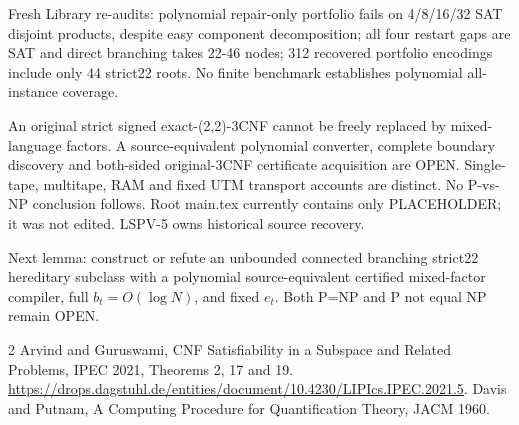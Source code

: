 \documentclass{article}
\begin{document}
Fresh Library re-audits: polynomial repair-only portfolio fails
on 4/8/16/32 SAT disjoint products, despite easy component decomposition;
all four restart gaps are SAT and direct branching takes 22-46 nodes;
312 recovered portfolio encodings include only 44 strict22 roots.
No finite benchmark establishes polynomial all-instance coverage.

An original strict signed exact-(2,2)-3CNF cannot be freely replaced
by mixed-language factors. A source-equivalent polynomial converter,
complete boundary discovery and both-sided original-3CNF certificate
acquisition are OPEN. Single-tape, multitape, RAM and fixed UTM
transport accounts are distinct. No P-vs-NP conclusion follows.
Root main.tex currently contains only PLACEHOLDER; it was not edited.
LSPV-5 owns historical source recovery.

Next lemma: construct or refute an unbounded connected branching strict22
hereditary subclass with a polynomial source-equivalent certified
mixed-factor compiler, full $b_t=O(\log N)$, and fixed $e_t$.
Both P=NP and P not equal NP remain OPEN.

\begin{thebibliography}{2}
 Arvind and Guruswami, CNF Satisfiability in a Subspace and
Related Problems, IPEC 2021, Theorems 2, 17 and 19.
\url{https://drops.dagstuhl.de/entities/document/10.4230/LIPIcs.IPEC.2021.5}.
 Davis and Putnam, A Computing Procedure for
Quantification Theory, JACM 1960.
\end{thebibliography}
\end{document}
